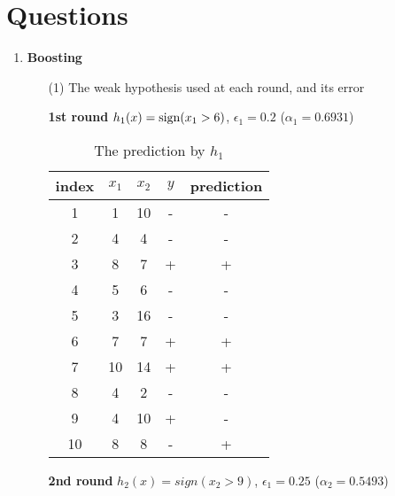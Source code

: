 

\oddsidemargin 0in
\evensidemargin 0in
\textwidth 6.5in
\topmargin -0.5in
\textheight 9.0in




\pagestyle{myheadings}  %

\section*{Questions}

\begin{enumerate}
\item {\bf Boosting}

\begin{enumerate}
\item[(1)] The weak hypothesis used at each round, and its error

{\bf 1st round} $h_1(x)={\rm sign} (x_1>6)$, $\epsilon_1=0.2$ ($\alpha_1=0.6931$)

\begin{table}[htb]
  \begin{center}
  \begin{tabular}{|c|c|c|c|c|} \hline
    index & $x_1$ & $x_2$ & $y$ & prediction \\ \hline
    1 & 1 & 10 & - & - \\ \hline
    2 & 4 & 4 & - & -\\ \hline
    3 & 8 & 7 & + & + \\ \hline
    4 & 5 & 6 & - & - \\ \hline
    5 & 3 & 16 & - & - \\ \hline
    6 & 7 & 7 & + & + \\ \hline
    7 & 10 & 14 & + & + \\ \hline
    8 & 4 & 2 & - & - \\ \hline
    9 & 4 & 10 & + & - \\ \hline
    10 & 8 & 8 & - & + \\ \hline
  \end{tabular}
  \caption{The prediction by $h_1$}
  \label{tab:1st_round_prediction}
  \end{center}
\end{table}

{\bf 2nd round} $h_2(x)=sign (x_2>9)$, $\epsilon_1=0.25$ ($\alpha_2=0.5493$)


\end{enumerate}
\end{enumerate}
